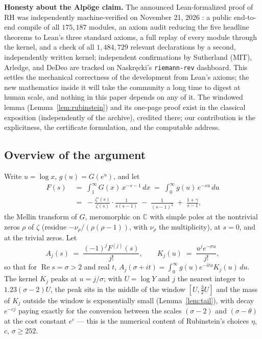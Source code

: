 \documentclass[11pt]{amsart}
\numberwithin{equation}{section}
\newcommand{\C}{\mathbb{C}}
\newcommand{\re}{\operatorname{Re}}
\newcommand{\Sig}{\sigma}
\newcommand{\Euler}{\gamma}
\begin{document}
\textbf{Honesty about the Alp\"oge claim.} The announced Lean-formalized
proof of RH \cite{Alp26} was independently machine-verified on November
21, 2026 \cite{Rub26v}: a public end-to-end compile of all $175{,}187$
modules, an axiom audit reducing the five headline theorems to Lean's
three standard axioms, a full replay of every module through the
kernel, and a check of all $1{,}484{,}729$ relevant declarations by a
second, independently written kernel; independent confirmations by
Sutherland (MIT), Arledge, and DeDeo are tracked on Naskr\k{e}cki's
\texttt{riemann-rev} dashboard. This settles the mechanical correctness
of the development from Lean's axioms; the new mathematics inside it
will take the community a long time to digest at human scale, and
nothing in this paper depends on any of it. The windowed lemma
(Lemma~\ref{lem:rubinstein}) and its one-page proof exist in the
classical exposition \cite{Rub26} (independently of the archive),
credited there; our contribution is the explicitness, the certificate
formulation, and the computable address.

\subsection{Overview of the argument}

Write $u = \log x$, $g(u) = G(e^{u})$, and let
\begin{equation}\label{eq:Fdef}
\begin{split}
F(s) \;&=\; \int_1^\infty G(x)\, x^{-s-1}\,dx
      \;=\; \int_0^\infty g(u)\, e^{-su}\,du\\
     \;&=\; -\frac{\zeta'(s)}{\zeta(s)} \cdot \frac{1}{s(s-1)}
            \;-\; \frac{1}{(s-1)^2} \;+\; \frac{1+\Euler}{s-1},
\end{split}
\end{equation}
the Mellin transform of $G$, meromorphic on $\C$ with simple poles at the
nontrivial zeros $\rho$ of $\zeta$ (residue $-\nu_{\rho}/(\rho(\rho-1))$,
with $\nu_\rho$ the multiplicity), at $s=0$, and at the trivial zeros.
Let
\[
A_j(s) \;=\; \frac{(-1)^j F^{(j)}(s)}{j!},
\qquad
K_j(u) \;=\; \frac{u^j e^{-\Sig u}}{j!},
\]
so that for $\re s = \Sig > 2$ and real $t$,
$A_j(\Sig + it) = \int_0^\infty g(u) e^{-itu} K_j(u)\,du$.
The kernel $K_j$ peaks at $u = j/\Sig$; with $U = \log Y$ and $j$ the
nearest integer to $1.23(\Sig-2)U$, the peak sits in the middle of the
window $[U, \tfrac32 U]$ and the mass of $K_j$ outside the window is
exponentially small (Lemma~\ref{lem:tail}), with decay $e^{-cj}$ paying
exactly for the conversion between the scales $(\Sig-2)$ and
$(\Sig-\theta)$ at the cost constant $e^{c}$ --- this is the numerical
content of Rubinstein's choices $\eta$, $c$, $\Sig \ge 252$.
\end{document}
